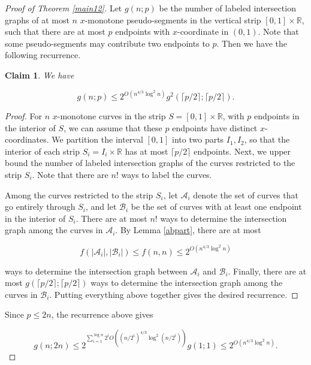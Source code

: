 \documentclass[11pt]{article}
\theoremstyle{plain}
\newtheorem{claim}[theorem]{Claim}
\theoremstyle{definition}
\theoremstyle{remark}
\begin{document}
\begin{proof}[Proof of Theorem \ref{main12}]
    Let $g(n;p)$ be the number of labeled intersection graphs of at most $n$ $x$-monotone pseudo-segments in the vertical strip $[0,1]\times \mathbb{R}$, such that there are at most $p$ endpoints with $x$-coordinate in $(0,1)$.  Note that some pseudo-segments may contribute two endpoints to $p$.   Then we have the following recurrence.


\begin{claim}
    We have 

    $$g(n;p) \leq 2^{O\left(n^{4/3}\log^2n\right)}g^2(\lceil p/2\rceil;\lceil p/2\rceil).$$
\end{claim}


  \begin{proof}
      For $n$ $x$-monotone curves in the strip $S = [0,1]\times \mathbb{R}$, with $p$ endpoints in the interior of $S$, we can assume that these $p$ endpoints have distinct $x$-coordinates. We partition the interval $[0,1]$ into two parts $I_1,I_2$, so that the interior of each strip $S_i = I_i\times \mathbb{R}$ has at most $\lceil p/2\rceil$ endpoints. Next, we upper bound the number of labeled intersection graphs of the curves restricted to the strip $S_i$. Note that there are $n!$ ways to label the curves. 

Among the curves restricted to the strip $S_i$, let $\mathcal{A}_i$ denote the set of curves that go entirely through $S_i$, and let $\mathcal{B}_i$ be the set of curves with at least one endpoint in the interior of $S_i$.  There are at most $n!$ ways to determine the intersection graph among the curves in $\mathcal{A}_i$.  By Lemma \ref{abpart}, there are at most

$$f(|\mathcal{A}_i|,|\mathcal{B}_i|) \leq f(n,n) \leq 2^{O(n^{4/3}\log^2n)}$$

\noindent ways to determine the intersection graph between $\mathcal{A}_i$ and $\mathcal{B}_i$.  Finally, there are at most $g(\lceil p/2\rceil;\lceil p/2\rceil)$ ways to determine the intersection graph among the curves in $\mathcal{B}_i$.  Putting everything above together gives the desired recurrence.    \end{proof}

Since $p\leq 2n$, the recurrence above gives 

$$g(n;2n) \leq 2^{\sum\limits_{i  = 1}^{\log n} 2^iO\left((n/2^i)^{4/3}\log^2(n/2^i)\right)}g(1;1) \leq 2^{O(n^{4/3}\log^2n)}.$$

 
\end{proof}
\end{document}
